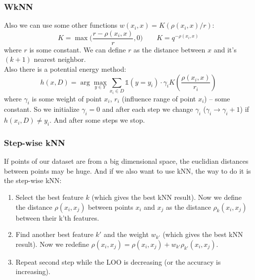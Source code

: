 \subsubsection*{WkNN}

Also we can use some other functions $w(x_i,x)=K(\rho(x_i,x)/r)$:
$$K=\max\Big(\frac{r-\rho(x_i,x)}{r}, 0\Big)\qquad K=q^{-\rho(x_i,x)}$$
where $r$ is some constant. We can define $r$ as the distance between $x$ and it's $(k+1)$ nearest neighbor.\\
Also there is a potential energy method:
$$h(x, D)=\arg\max\limits_{y\in Y}\sum\limits_{x_i\in D}\mathbb{1}(y=y_i)\cdot\gamma_i K\left(\frac{\rho(x_i,x)}{r_i}\right)$$
where $\gamma_i$ is some weight of point $x_i$, $r_i$ (influence range of point $x_i$) -- some constant. So we initialize $\gamma_i=0$ and after each step we change $\gamma_i$ ($\gamma_i\to\gamma_i+1$) if $h(x_i, D)\ne y_i$. And after some steps we stop.

\subsubsection*{Step-wise kNN}

If points of our dataset are from a big dimensional space, the euclidian distances between points may be huge. And if we also want to use kNN, the way to do it is the step-wise kNN:
\begin{enumerate}
	\item Select the best feature $k$ (which gives the best kNN result). Now we define the distance $\rho(x_i, x_j)$ between points $x_i$ and $x_j$ as the distance $\rho_k(x_i,x_j)$ between their k'th features.
	\item Find another best feature $k'$ and the weight $w_{k'}$ (which gives the best kNN result). Now we redefine $\rho(x_i,x_j)=\rho(x_i,x_j)+w_{k'}\rho_{k'}(x_i,x_j)$.
	\item Repeat second step while the LOO is decreasing (or the accuracy is increasing).
\end{enumerate}